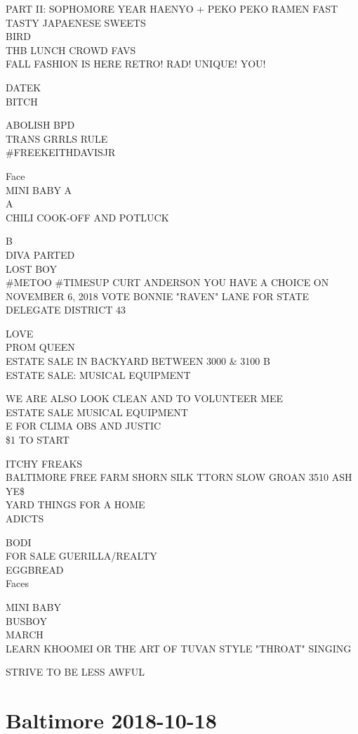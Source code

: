 \documentclass[10pt,letterpaper]{article}
\begin{document}
PART II: SOPHOMORE YEAR HAENYO + PEKO PEKO RAMEN FAST TASTY JAPAENESE SWEETS\\
BIRD\\
THB LUNCH CROWD FAVS\\
FALL FASHION IS HERE RETRO! RAD! UNIQUE! YOU!

DATEK\\
BITCH

ABOLISH BPD\\
TRANS GRRLS RULE\\
\#FREEKEITHDAVISJR

Face\\
MINI BABY A\\
A\\
CHILI COOK{-}OFF AND POTLUCK

B\\
DIVA PARTED\\
LOST BOY\\
\#METOO \#TIMESUP CURT ANDERSON YOU HAVE A CHOICE ON NOVEMBER 6, 2018 VOTE BONNIE "RAVEN" LANE FOR STATE DELEGATE DISTRICT 43

LOVE\\
PROM QUEEN\\
ESTATE SALE IN BACKYARD BETWEEN 3000 \& 3100 B\\
ESTATE SALE: MUSICAL EQUIPMENT

WE ARE ALSO LOOK CLEAN AND TO VOLUNTEER MEE\\
ESTATE SALE MUSICAL EQUIPMENT\\
E FOR CLIMA OBS AND JUSTIC\\
\$1 TO START

ITCHY FREAKS\\
BALTIMORE FREE FARM SHORN SILK TTORN SLOW GROAN 3510 ASH YE\$\\
YARD THINGS FOR A HOME\\
ADICTS

BODI\\
FOR SALE GUERILLA/REALTY\\
EGGBREAD\\
Faces

MINI BABY\\
BUSBOY\\
MARCH\\
LEARN KHOOMEI OR THE ART OF TUVAN STYLE "THROAT" SINGING

STRIVE TO BE LESS AWFUL


\section*{Baltimore 2018-10-18}
\end{document}
